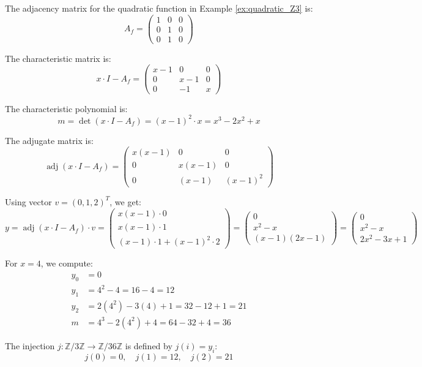 \begin{remark}
The adjacency matrix for the quadratic function in Example \ref{ex:quadratic_Z3} is:
$$A_f = \begin{pmatrix}
1 & 0 & 0 \\
0 & 1 & 0 \\
0 & 1 & 0
\end{pmatrix}$$

The characteristic matrix is:
$$x \cdot I - A_f = \begin{pmatrix}
x-1 & 0 & 0 \\
0 & x-1 & 0 \\
0 & -1 & x
\end{pmatrix}$$

The characteristic polynomial is:
$$m = \det(x \cdot I - A_f) = (x-1)^2 \cdot x = x^3 - 2x^2 + x$$

The adjugate matrix is:
$$\operatorname{adj}(x \cdot I - A_f) = \begin{pmatrix}
x(x-1) & 0 & 0 \\
0 & x(x-1) & 0 \\
0 & (x-1) & (x-1)^2
\end{pmatrix}$$

Using vector $v = (0, 1, 2)^T$, we get:
$$y = \operatorname{adj}(x \cdot I - A_f) \cdot v = \begin{pmatrix}
x(x-1) \cdot 0 \\
x(x-1) \cdot 1 \\
(x-1) \cdot 1 + (x-1)^2 \cdot 2
\end{pmatrix} = \begin{pmatrix}
0 \\
x^2 - x \\
(x-1)(2x-1)
\end{pmatrix} = \begin{pmatrix}
0 \\
x^2 - x \\
2x^2 - 3x + 1
\end{pmatrix}$$

For $x = 4$, we compute:
\begin{align*}
y_0 &= 0 \\
y_1 &= 4^2 - 4 = 16 - 4 = 12 \\
y_2 &= 2(4^2) - 3(4) + 1 = 32 - 12 + 1 = 21 \\
m &= 4^3 - 2(4^2) + 4 = 64 - 32 + 4 = 36
\end{align*}

The injection $j: \mathbb{Z}/3\mathbb{Z} \to \mathbb{Z}/36\mathbb{Z}$ is defined by $j(i) = y_i$:
$$j(0) = 0, \quad j(1) = 12, \quad j(2) = 21$$


\end{remark}
